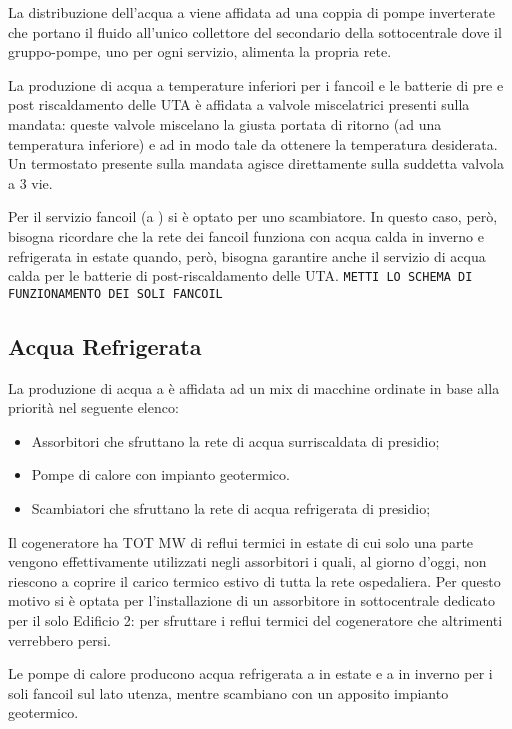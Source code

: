 La distribuzione dell'acqua a  viene affidata ad una coppia di pompe inverterate che portano il fluido all'unico collettore del secondario della sottocentrale dove il gruppo-pompe, uno per ogni servizio, alimenta la propria rete. 

La produzione di acqua a temperature inferiori per i fancoil e le batterie di pre e post riscaldamento delle UTA è affidata a valvole miscelatrici presenti sulla mandata: queste valvole miscelano la giusta portata di ritorno (ad una temperatura inferiore) e ad  in modo tale da ottenere la temperatura desiderata. Un termostato presente sulla mandata agisce direttamente sulla suddetta valvola a 3 vie.

Per il servizio fancoil (a ) si è optato per uno scambiatore. In questo caso, però, bisogna ricordare che la rete dei fancoil funziona con acqua calda in inverno e refrigerata in estate quando, però, bisogna garantire anche il servizio di acqua calda per le batterie di post-riscaldamento delle UTA. \texttt{METTI LO SCHEMA DI FUNZIONAMENTO DEI SOLI FANCOIL}

\subsection{Acqua Refrigerata}
La produzione di acqua a  è affidata ad un mix di macchine ordinate in base alla priorità nel seguente elenco:
\begin{itemize}
	\item Assorbitori che sfruttano la rete di acqua surriscaldata di presidio;
	\item Pompe di calore con impianto geotermico.	
	\item Scambiatori che sfruttano la rete di acqua refrigerata di presidio;
\end{itemize}
Il cogeneratore ha TOT MW di reflui termici in estate di cui solo una parte vengono effettivamente utilizzati negli assorbitori i quali, al giorno d'oggi, non riescono a coprire il carico termico estivo di tutta la rete ospedaliera. Per questo motivo si è optata per l'installazione di un assorbitore in sottocentrale dedicato per il solo Edificio 2: per sfruttare i reflui termici del cogeneratore che altrimenti verrebbero persi.

Le pompe di calore producono acqua refrigerata a  in estate e a  in inverno per i soli fancoil sul lato utenza, mentre scambiano con un apposito impianto geotermico.

